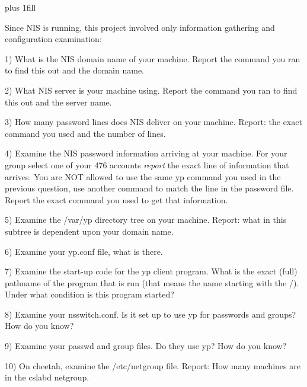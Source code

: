 
\rightskip=0pt plus 1fill

\parindent 0pt

Since NIS is running, this project involved only
information gathering and configuration examination:

1) What is the NIS domain name of your machine.
Report the command you ran to find this out and the domain name.

2) What NIS server is your machine using.
Report the command you ran to find this out and the server name.

3) How many password lines does NIS deliver on your machine.
Report: the exact command you used and the number of lines.

4) Examine the NIS password information arriving at your machine.
For your group select one of your 476 accounts {\it report} the exact line of 
information that arrives.
You are NOT allowed to use the same yp command you used in the previous
question, use another command to match the line in the password file.
Report the exact command you used to get that information.

5) Examine the {\ltt{}/var/yp} directory tree on your machine.
Report: what in this subtree is dependent upon your domain name.

6) Examine your {\ltt{}yp.conf} file, what is there.

7) Examine the start-up code for the yp client program.
What is the exact (full) pathname of the program that is run
(that means the name starting with the {\ltt{}/}).
Under what condition is this program started?

8) Examine your {\ltt{}nsswitch.conf}.
Is it set up to use yp for passwords and groups?
How do you know?

9) Examine your {\ltt{}passwd} and {\ltt{}group} files.
Do they use yp? How do you know? 

10)  On cheetah, examine the {\ltt{}/etc/netgroup} file.
Report: How many machines are in the {\ltt{}cslabd} netgroup.
\bye
